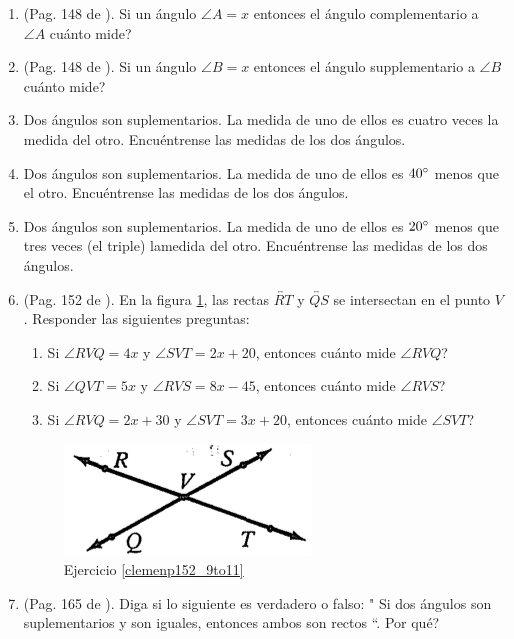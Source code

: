 \begin{enumerate}
	\item \label{clemenp147_15} (Pag. 148 de \cite{clemens}). Si un ángulo $\angle A = x$ entonces el ángulo complementario a $\angle A$ cuánto mide?
	\item \label{clemenp147_16} (Pag. 148 de \cite{clemens}). Si un ángulo $\angle B = x$ entonces el ángulo supplementario a $\angle B$ cuánto mide?	
	\item Dos ángulos son suplementarios. La medida de uno de ellos es cuatro veces la medida del otro. Encuéntrense las medidas de los dos ángulos.
	\item Dos ángulos son suplementarios. La medida de uno de ellos es $40\degree$ menos que el otro. Encuéntrense las medidas de los dos ángulos.		
	\item Dos ángulos son suplementarios. La medida de uno de ellos es $20\degree$ menos que tres veces (el triple) lamedida del otro. Encuéntrense las medidas de los dos ángulos.					
	
	\item \label{clemenp152_9to11} (Pag. 152 de \cite{clemens}). En la figura \ref{figclemenp147_9to11},  las rectas $\overleftrightarrow{RT}$ y $\overleftrightarrow{QS}$ se intersectan en el punto $V$. Responder las siguientes preguntas:
	\begin{enumerate}[label=\Alph*) ]
		\item Si $\angle RVQ = 4x$ y $\angle SVT = 2x+20$, entonces cuánto mide $\angle RVQ$?					
		\item Si $\angle QVT = 5x$ y $\angle RVS = 8x-45$, entonces cuánto mide $\angle RVS$?			
		\item Si $\angle RVQ = 2x+30$ y $\angle SVT = 3x+20$, entonces cuánto mide $\angle SVT$?			
	\end{enumerate}
	\begin{figure}[H]
		\centering
		\includegraphics[width=0.4\linewidth]{Geometria/imgs/clemenp147_9to11}
		\caption{Ejercicio \ref{clemenp152_9to11}}
		\label{figclemenp147_9to11}
	\end{figure}
	
	\item \label{clemenp165_} (Pag. 165 de \cite{clemens}). Diga si lo siguiente es verdadero o falso: " Si dos ángulos son suplementarios y son iguales, entonces ambos son rectos ``. Por qué?
	

\end{enumerate}
